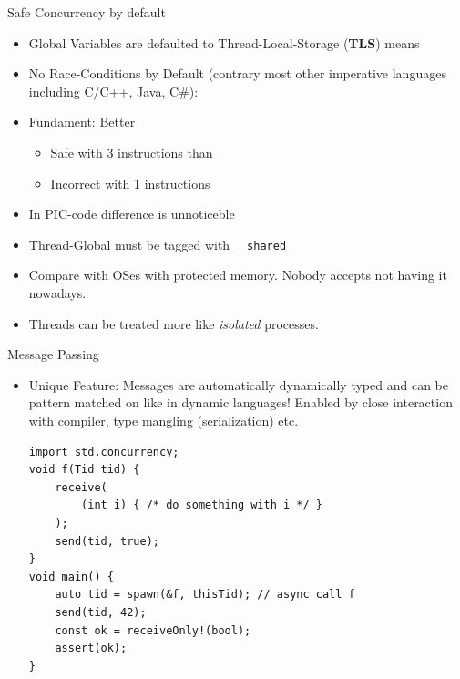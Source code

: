 \documentclass[xcolor=dvipsnames]{beamer}
\begin{document}
\begin{frame}[fragile]{Safe Concurrency by default}
  \begin{itemize}[<+->]
  \item Global Variables are defaulted to Thread-Local-Storage (\textbf{TLS}) means
  \item No Race-Conditions by Default (contrary most other imperative languages
    including C/C++, Java, C\#):
  \item Fundament: Better
    \begin{itemize}[<+->]
    \item Safe with 3 instructions than
    \item Incorrect with 1 instructions
    \end{itemize}
  \item In PIC-code difference is unnoticeble
  \item Thread-Global must be tagged with \texttt{\_\_shared}
  \item Compare with OSes with protected memory. Nobody accepts not having it
    nowadays.
  \item Threads can be treated more like \emph{isolated} processes.
  \end{itemize}
\end{frame}

\begin{frame}[fragile]{Message Passing}
  \begin{itemize}[<+->]
  \item Unique Feature: Messages are automatically dynamically typed and can be
    pattern matched on like in dynamic languages! Enabled by close interaction
    with compiler, type mangling (serialization) etc.
\begin{lstlisting}[frame=single]
import std.concurrency;
void f(Tid tid) {
    receive(
        (int i) { /* do something with i */ }
    );
    send(tid, true);
}
void main() {
    auto tid = spawn(&f, thisTid); // async call f
    send(tid, 42);
    const ok = receiveOnly!(bool);
    assert(ok);
}
\end{lstlisting}
  \end{itemize}
\end{frame}
\end{document}
